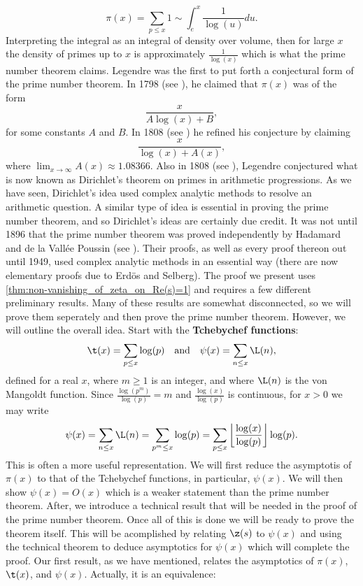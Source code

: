       \[
        \pi(x) = \sum_{p \le x}1 \sim \int_{e}^{x}\frac{1}{\log(u)}du.
      \]
      Interpreting the integral as an integral of density over volume, then for large $x$ the density of primes up to $x$ is approximately $\frac{1}{\log(x)}$ which is what the prime number theorem claims. Legendre was the first to put forth a conjectural form of the prime number theorem. In 1798 (see \cite{legendre1798essai}), he claimed that $\pi(x)$ was of the form
      \[
        \frac{x}{A\log(x)+B},
      \]
      for some constants $A$ and $B$. In 1808 (see \cite{legendre1808essai}) he refined his conjecture by claiming
      \[
        \frac{x}{\log(x)+A(x)},
      \]
      where $\lim_{x \to \infty}A(x) \approx 1.08366$. Also in 1808 (see \cite{legendre1808essai}), Legendre conjectured what is now known as Dirichlet's theorem on primes in arithmetic progressions. As we have seen, Dirichlet's idea used complex analytic methods to resolve an arithmetic question. A similar type of idea is essential in proving the prime number theorem, and so Dirichlet's ideas are certainly due credit. It was not until 1896 that the prime number theorem was proved independently by Hadamard and de la Vall\'ee Poussin (see \cite{hadamard1896distribution,poussin1897recherches}). Their proofs, as well as every proof thereon out until 1949, used complex analytic methods in an essential way (there are now elementary proofs due to Erd\"os and Selberg). The proof we present uses \cref{thm:non-vanishing_of_zeta_on_Re(s)=1} and requires a few different preliminary results. Many of these results are somewhat disconnected, so we will prove them seperately and then prove the prime number theorem. However, we will outline the overall idea. Start with the \textbf{Tchebychef functions}:
      \[
        \t(x) = \sum_{p \le x}\log(p) \quad \text{and} \quad \psi(x) = \sum_{n \le x}\L(n),
      \]
      defined for a real $x$, where $m \ge 1$ is an integer, and where $\L(n)$ is the von Mangoldt function. Since $\frac{\log(p^{m})}{\log(p)} = m$ and $\frac{\log(x)}{\log(p)}$ is continuous, for $x > 0$ we may write
      \begin{equation}\label{equ:alternative_form_for_Tchebychef function}
        \psi(x) = \sum_{n \le x}\L(n) = \sum_{p^{m} \le x}\log(p) = \sum_{p \le x}\left\lfloor\frac{\log(x)}{\log(p)}\right\rfloor\log(p).
      \end{equation}
      This is often a more useful representation. We will first reduce the asymptotis of $\pi(x)$ to that of the Tchebychef functions, in particular, $\psi(x)$. We will then show $\psi(x) = O(x)$ which is a weaker statement than the prime number theorem. After, we introduce a technical result that will be needed in the proof of the prime number theorem. Once all of this is done we will be ready to prove the theorem itself. This will be acomplished by relating $\z(s)$ to $\psi(x)$ and using the technical theorem to deduce asymptotics for $\psi(x)$ which will complete the proof. Our first result, as we have mentioned, relates the asymptotics of $\pi(x)$, $\t(x)$, and $\psi(x)$. Actually, it is an equivalence:

